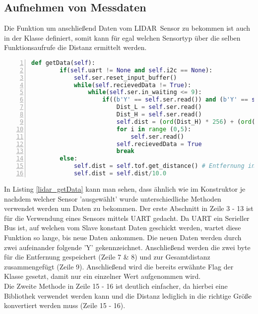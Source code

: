 \subsection{Aufnehmen von Messdaten}
Die Funktion um anschließend Daten vom \ac{LIDAR} Sensor zu bekommen ist auch in der Klasse definiert, somit kann für egal welchen Sensortyp über die selben Funktionsaufrufe die Distanz ermittelt werden. 
\begin{lstlisting}[caption={Funktion um Distanz vom \ac{LIDAR} Sensor zu erhalten}, language={Python}, label={lidar_getData}, numbers=left]
	def getData(self):
        if(self.uart != None and self.i2c == None):
            self.ser.reset_input_buffer()
            while(self.recievedData != True):
                while(self.ser.in_waiting <= 9):
                    if((b'Y' == self.ser.read()) and (b'Y' == self.ser.read())):
                        Dist_L = self.ser.read()
                        Dist_H = self.ser.read()
                        self.dist = (ord(Dist_H) * 256) + (ord(Dist_L))
                        for i in range (0,5):
                            self.ser.read()
                        self.recievedData = True
                        break
        else:
            self.dist = self.tof.get_distance() # Entfernung in mm
            self.dist = self.dist/10.0
\end{lstlisting}
In Listing \ref{lidar_getData} kann man sehen, dass ähnlich wie im Konstruktor je nachdem welcher Sensor 'ausgewählt' wurde unterschiedliche Methoden verwendet werden um Daten zu bekommen. Der erste Abschnitt in Zeile 3 - 13 ist für die Verwendung eines Sensors mittels \ac{UART} gedacht. Da \ac{UART} ein Serieller Bus ist, auf welchen vom Slave konstant Daten geschickt werden, wartet diese Funktion so lange, bis neue Daten ankommen. Die neuen Daten werden durch zwei aufeinander folgende 'Y' gekennzeichnet. Anschließend werden die zwei byte für die Entfernung gespeichert (Zeile 7 \& 8) und zur Gesamtdistanz zusammengefügt (Zeile 9). Anschließend wird die bereits erwähnte Flag der Klasse gesetzt, damit nur ein einzelner Wert aufgenommen wird.\\
Die Zweite Methode in Zeile 15 - 16 ist deutlich einfacher, da hierbei eine Bibliothek verwendet werden kann und die Distanz lediglich in die richtige Größe konvertiert werden muss (Zeile 15 - 16).
